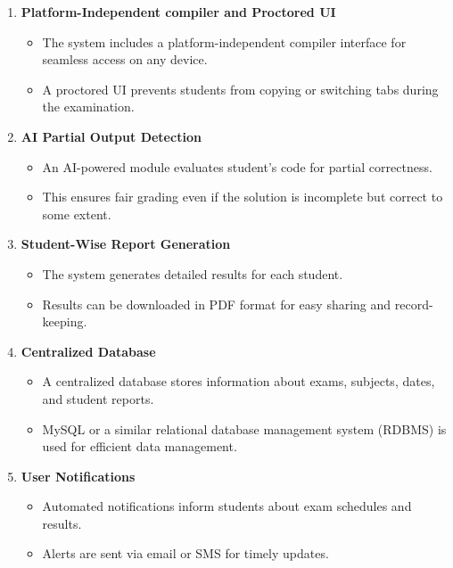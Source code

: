 \documentclass[14pt]{article}
\begin{document}
\begin{enumerate}
\begin{enumerate}
\item \textbf{Platform-Independent compiler and Proctored UI}
\begin{itemize}
\item The system includes a platform-independent compiler interface for seamless access on any device.
\item A proctored UI prevents students from copying or switching tabs during the examination.
\end{itemize}
\item \textbf{AI Partial Output Detection}
\begin{itemize}
\item An AI-powered module evaluates student's code for partial correctness.
\item This ensures fair grading even if the solution is incomplete but correct to some extent.
\end{itemize}
\item \textbf{Student-Wise Report Generation}
\begin{itemize}
\item The system generates detailed results for each student.
\item Results can be downloaded in PDF format for easy sharing and record-keeping.
\end{itemize}
\item \textbf{Centralized Database}
\begin{itemize}
\item A centralized database stores information about exams, subjects, dates, and student reports.
\item MySQL or a similar relational database management system (RDBMS) is used for efficient data management.
\end{itemize}
\item \textbf{User Notifications}
\begin{itemize}
\item Automated notifications inform students about exam schedules and results.
\item Alerts are sent via email or SMS for timely updates.
\end{itemize}
\end{enumerate}



\end{enumerate}
\end{document}
